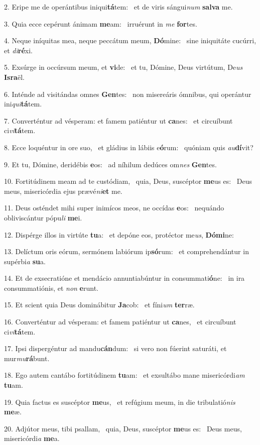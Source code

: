 2. Eripe me de operántibus iniqui\textbf{tá}tem: \ast\  et de viris sángui\textit{num} \textbf{sal}\textbf{va} me.\

3. Quia ecce cepérunt ánimam \textbf{me}am: \ast\  irruérunt in \textit{me} \textbf{for}tes.\

4. Neque iníquitas mea, neque peccátum meum, \textbf{Dó}mine: \ast\  sine iniquitáte cucúrri, et \textit{di}\textbf{ré}xi.\

5. Exsúrge in occúrsum meum, et \textbf{vi}de: \ast\  et tu, Dómine, Deus virtútum, De\textit{us} \textbf{Is}\textbf{ra}ël.\

6. Inténde ad visitándas omnes \textbf{Gen}tes: \ast\  non misereáris ómnibus, qui operántur ini\textit{qui}\textbf{tá}tem.\

7. Converténtur ad vésperam: et famem patiéntur ut \textbf{ca}nes: \ast\  et circuíbunt ci\textit{vi}\textbf{tá}tem.\

8. Ecce loquéntur in ore suo, \dag\  et gládius in lábiis e\textbf{ó}rum: \ast\  quóniam quis \textit{au}\textbf{dí}vit?\

9. Et tu, Dómine, deridébis \textbf{e}os: \ast\  ad níhilum dedúces om\textit{nes} \textbf{Gen}tes.\

10. Fortitúdinem meam ad te custódiam, \dag\  quia, Deus, suscéptor \textbf{me}us es: \ast\  Deus meus, misericórdia ejus prævé\textit{ni}\textbf{et} me.\

11. Deus osténdet mihi super inimícos meos, ne occídas \textbf{e}os: \ast\  nequándo obliviscántur pópu\textit{li} \textbf{me}i.\

12. Dispérge illos in virtúte \textbf{tu}a: \ast\  et depóne eos, protéctor me\textit{us}, \textbf{Dó}\textbf{mi}ne:\

13. Delíctum oris eórum, sermónem labiórum ip\textbf{só}rum: \ast\  et comprehendántur in supérbi\textit{a} \textbf{su}a.\

14. Et de exsecratióne et mendácio annuntiabúntur in consummati\textbf{ó}ne: \ast\  in ira consummatiónis, et \textit{non} \textbf{e}runt.\

15. Et scient quia Deus dominábitur \textbf{Ja}cob: \ast\  et fíni\textit{um} \textbf{ter}ræ.\

16. Converténtur ad vésperam: et famem patiéntur ut \textbf{ca}nes, \ast\  et circuíbunt ci\textit{vi}\textbf{tá}tem.\

17. Ipsi dispergéntur ad mandu\textbf{cán}dum: \ast\  si vero non fúerint saturáti, et mur\textit{mu}\textbf{rá}bunt.\

18. Ego autem cantábo fortitúdinem \textbf{tu}am: \ast\  et exsultábo mane misericórdi\textit{am} \textbf{tu}am.\

19. Quia factus es suscéptor \textbf{me}us, \ast\  et refúgium meum, in die tribulatió\textit{nis} \textbf{me}æ.\

20. Adjútor meus, tibi psallam, \dag\  quia, Deus, suscéptor \textbf{me}us es: \ast\  Deus meus, misericórdi\textit{a} \textbf{me}a.\

